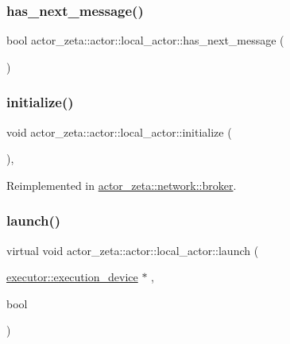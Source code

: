 \subsubsection{\texorpdfstring{has\+\_\+next\+\_\+message()}{has\_next\_message()}}
{\footnotesize\ttfamily bool actor\+\_\+zeta\+::actor\+::local\+\_\+actor\+::has\+\_\+next\+\_\+message (\begin{DoxyParamCaption}{ }\end{DoxyParamCaption})\hspace{0.3cm}{\ttfamily [protected]}}

\mbox{\label{classactor__zeta_1_1actor_1_1local__actor_ab540625b83fa06318a2ae41dcca4ca16}} 
\subsubsection{\texorpdfstring{initialize()}{initialize()}}
{\footnotesize\ttfamily void actor\+\_\+zeta\+::actor\+::local\+\_\+actor\+::initialize (\begin{DoxyParamCaption}{ }\end{DoxyParamCaption})\hspace{0.3cm}{\ttfamily [protected]}, {\ttfamily [virtual]}}



Reimplemented in \hyperlink{classactor__zeta_1_1network_1_1broker_a5e63848370208ff7e670ec08ea7b3cf9}{actor\+\_\+zeta\+::network\+::broker}.

\mbox{\label{classactor__zeta_1_1actor_1_1local__actor_acfba412b813aee3250c589bee232f3cd}} 
\subsubsection{\texorpdfstring{launch()}{launch()}}
{\footnotesize\ttfamily virtual void actor\+\_\+zeta\+::actor\+::local\+\_\+actor\+::launch (\begin{DoxyParamCaption}\item[{\hyperlink{structactor__zeta_1_1executor_1_1execution__device}{executor\+::execution\+\_\+device} $\ast$}]{,  }\item[{bool}]{ }\end{DoxyParamCaption})\hspace{0.3cm}{\ttfamily [pure virtual]}}



